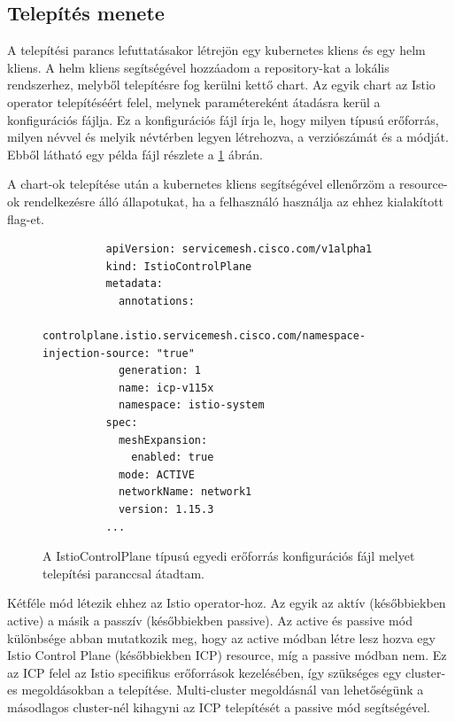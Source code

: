 \subsection*{Telepítés menete}
A telepítési parancs lefuttatásakor létrejön egy kubernetes kliens és egy helm kliens.
A helm kliens segítségével hozzáadom a repository-kat a lokális rendszerhez, melyből telepítésre fog kerülni kettő chart.
Az egyik chart az Istio operator telepítéséért felel, melynek paramétereként átadásra kerül a konfigurációs fájlja.
Ez a konfigurációs fájl írja le, hogy milyen típusú erőforrás, milyen névvel és melyik névtérben legyen létrehozva, a verziószámát és a módját.
Ebből látható egy példa fájl részlete a \ref{sample-icp-config} ábrán.

A chart-ok telepítése után a kubernetes kliens segítségével ellenőrzöm a resource-ok rendelkezésre álló állapotukat, ha a felhasználó használja az ehhez kialakított flag-et.

\begin{figure}
  \centering
  \begin{minipage}{\linewidth}
      \begin{lstlisting}
          apiVersion: servicemesh.cisco.com/v1alpha1
          kind: IstioControlPlane
          metadata:
            annotations:
              controlplane.istio.servicemesh.cisco.com/namespace-injection-source: "true"
            generation: 1
            name: icp-v115x
            namespace: istio-system
          spec:
            meshExpansion:
              enabled: true
            mode: ACTIVE
            networkName: network1
            version: 1.15.3
          ...
      \end{lstlisting}
  \end{minipage}
  \caption{A IstioControlPlane típusú egyedi erőforrás konfigurációs fájl melyet telepítési paranccsal átadtam.}
    \label{sample-icp-config}
\end{figure}

Kétféle mód létezik ehhez az Istio operator-hoz. Az egyik az aktív (későbbiekben active) a másik a passzív (későbbiekben passive).
Az active és passive mód különbsége abban mutatkozik meg, hogy az active módban létre lesz hozva egy Istio Control Plane (későbbiekben ICP) resource, míg a passive módban nem.
Ez az ICP felel az Istio specifikus erőforrások kezelésében, így szükséges egy cluster-es megoldásokban a telepítése.
Multi-cluster megoldásnál van lehetőségünk a másodlagos cluster-nél kihagyni az ICP telepítését a passive mód segítségével.

